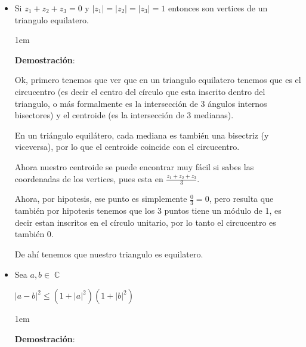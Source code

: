 \documentclass[12pt, fleqn]{report}                             %
\newenvironment{SmallIndentation}[1][0.75em]                    %
        {\begin{adjustwidth}{#1}{}\begin{footnotesize}}             %
        {\end{footnotesize}\end{adjustwidth}}                       %
\theoremstyle{break}                                            %
\DeclareMathOperator \Complexs     {\mathbb{C}}                 %
\begin{document}
            \begin{itemize}

                \item 
                    Si $z_1 + z_2 + z_3 = 0$ y $|z_1|=|z_2|=|z_3|=1$ entonces son vertices
                    de un triangulo equilatero.

                    \begin{SmallIndentation}[1em]
                        \textbf{Demostración}:
                        
                        Ok, primero tenemos que ver que en un triangulo equilatero tenemos que es
                        el circucentro (es decir el centro del círculo que esta inscrito dentro del
                        triangulo, o más formalmente es la intersección de 3 ángulos internos bisectores)
                        y el centroide (es la intersección de 3 medianas).

                        En un triángulo equilátero, cada mediana es también una bisectriz (y viceversa),
                        por lo que el centroide coincide con el circucentro.

                        Ahora nuestro centroide se puede encontrar muy fácil si sabes las coordenadas
                        de los vertices, pues esta en $\frac{z_1+z_2+z_3}{3}$.

                        Ahora, por hipotesis, ese punto es simplemente $\frac{0}{3} = 0$, pero resulta
                        que también por hipotesis tenemos que los 3 puntos tiene un módulo de 1, es decir
                        estan inscritos en el círculo unitario, por lo tanto el circucentro es también 0.

                        De ahí tenemos que nuestro triangulo es equilatero.

                    \end{SmallIndentation}
                        
                
                \item Sea $a, b \in \Complexs$ 

                    $|a-b|^2 \leq (1+|a|^2)(1+|b|^2)$

                    \begin{SmallIndentation}[1em]
                        \textbf{Demostración}:


\end{SmallIndentation}
\end{itemize}
\end{document}
